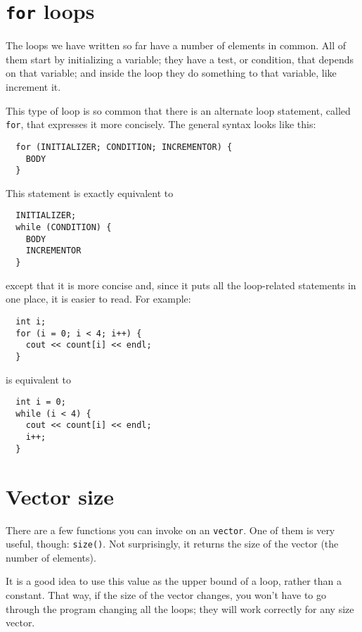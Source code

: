 \section{{\tt for} loops}

The loops we have written so far have a number of elements
in common.  All of them start by initializing a variable;
they have a test, or condition, that depends on that variable;
and inside the loop they do something to that variable,
like increment it.


This type of loop is so common that there is an alternate
loop statement, called {\tt for}, that expresses it more
concisely.  The general syntax looks like this:

\begin{verbatim}
  for (INITIALIZER; CONDITION; INCREMENTOR) {
    BODY
  }
\end{verbatim}
%
This statement is exactly equivalent to

\begin{verbatim}
  INITIALIZER;
  while (CONDITION) {
    BODY
    INCREMENTOR
  }
\end{verbatim}
%
except that it is more concise and, since it puts all the
loop-related statements in one place, it is easier to read.
For example:

\begin{verbatim}
  int i;
  for (i = 0; i < 4; i++) {
    cout << count[i] << endl;
  }
\end{verbatim}
%
is equivalent to 

\begin{verbatim}
  int i = 0;
  while (i < 4) {
    cout << count[i] << endl;
    i++;
  }
\end{verbatim}

\section{Vector size}

There are a few functions you can invoke on an
{\tt vector}.  One of them is very useful, though: {\tt size()}.
Not surprisingly, it returns the size of the vector (the number
of elements).

It is a good idea to use this value as the upper bound of a loop,
rather than a constant.  That way, if the size of the vector
changes, you won't have to go through the program changing all the
loops; they will work correctly for any size vector.


